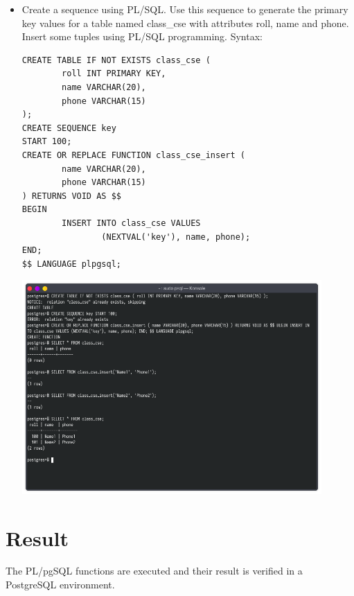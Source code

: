 \documentclass[13pt,oneside]{book}
\begin{document}
\begin{itemize}
\item
Create a sequence using PL/SQL. Use this sequence to generate the primary key
 values for a table named class\_cse with attributes roll, name and phone. Insert some
 tuples using PL/SQL programming.
Syntax:
\begin{verbatim}
CREATE TABLE IF NOT EXISTS class_cse (
        roll INT PRIMARY KEY,
        name VARCHAR(20),
        phone VARCHAR(15)
);
CREATE SEQUENCE key
START 100;
CREATE OR REPLACE FUNCTION class_cse_insert (
        name VARCHAR(20),
        phone VARCHAR(15)
) RETURNS VOID AS $$
BEGIN
        INSERT INTO class_cse VALUES 
                (NEXTVAL('key'), name, phone);
END;
$$ LANGUAGE plpgsql;
\end{verbatim}
\includegraphics[width=0.9\textwidth]{img/p9/ss6.png}
	
\end{itemize}
\section*{Result}
	The PL/pgSQL functions are executed and their result
	is verified in a PostgreSQL environment.
\end{document}
